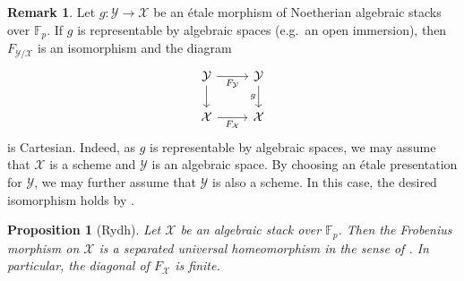 \documentclass[11pt]{amsart}
\theoremstyle{plain}
\newtheorem{proposition}[theorem]{Proposition}
\theoremstyle{definition}
\newtheorem{remark}[theorem]{Remark}
\numberwithin{equation}{section}
\numberwithin{theorem}{section}
\begin{document}
\begin{remark}
    \label{rm:etale_base_change_Frobenii}
    Let $g\colon \mathcal{Y} \to \mathcal{X}$ be an \'{e}tale morphism of Noetherian algebraic stacks over $\mathbb{F}_p$. 
    If $g$ is representable by algebraic spaces (e.g.\ an open immersion), then $F_{\mathcal{Y}/\mathcal{X}}$ is an isomorphism and the diagram
    \begin{displaymath}
        \begin{tikzcd}
            {\mathcal{Y}} & {\mathcal{Y}} \\
            {\mathcal{X}} & {\mathcal{X}}
            \arrow["F_{\mathcal{Y}}"', from=1-1, to=1-2]
            \arrow[from=1-1, to=2-1]
            \arrow["F_{\mathcal{X}}"', from=2-1, to=2-2]
            \arrow["g"', from=1-2, to=2-2]
        \end{tikzcd}
    \end{displaymath}
    is Cartesian. 
    Indeed, as $g$ is representable by algebraic spaces, we may assume that $\mathcal{X}$ is a scheme and $\mathcal{Y}$ is an algebraic space. By choosing an \'etale presentation for $\mathcal{Y}$, we may further assume that $\mathcal{Y}$ is also a scheme. In this case, the desired isomorphism holds by \cite[\href{https://stacks.math.columbia.edu/tag/0EBS}{Tag 0EBS}]{stacks-project}.
\end{remark}

\begin{proposition}
    [Rydh]
    \label{lem:homeomorphism_on_underlying_topological_space}
    Let $\mathcal{X}$ be an algebraic stack over $\mathbb{F}_p$. 
    Then the Frobenius morphism on $\mathcal{X}$ is a separated universal homeomorphism in the sense of \cite[\href{https://stacks.math.columbia.edu/tag/0CI7}{Tag 0CI7}]{stacks-project}. 
    In particular, the diagonal of $F_\mathcal{X}$ is finite.
\end{proposition}
\end{document}
